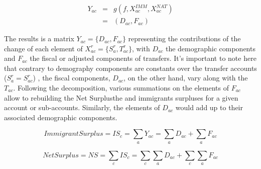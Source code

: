 \begin{eqnarray}
  Y_{ac}&=&g(f,X^{IMM}_{ac},X^{NAT}_{ac}) \nonumber \\
&=& (D_{ac}, F_{ac}) \label{eq:dc2}
\end{eqnarray}

The results is a matrix \( Y_{ac} = \{D_{ac}, F_{ac} \} \) representing the contributions of the change of each element of \( X^{r}_{ac} =  \{S^{r}_a, T^{r}_{ac} \}\), with \( D_{ac}\) the demographic components and \( F_{ac}\) the fiscal or adjusted components of transfers.
It's important to note here that contrary to demography components are constants over the transfer accounts (\( S^{r}_{a}=S^{r}_{ac} \)) , the fiscal components, \( D_{ac} \), on the other hand, vary along with the \(T_{ac}\).
Following the decomposition, various summations on the elements of \( F_{ac} \) allow to rebuilding the Net Surplusthe and immigrants surpluses for a given account or sub-accounts.
Similarly, the elements of \( D_{ac} \) would add up to their associated demographic components.

\begin{equation}\label{eq:dc3}
  Immigrant Surplus =IS_{c} = \displaystyle\sum_{a}Y_{ac} = \displaystyle\sum_{a}D_{ac} + \displaystyle\sum_{a}F_{ac}
\end{equation}

\begin{equation}\label{eq:dc4}
  Net Surplus = NS = \displaystyle\sum_{c}IS_{c} = \displaystyle\sum_{c}\displaystyle\sum_{a}D_{ac} + \displaystyle\sum_{c}\displaystyle\sum_{a}F_{ac}
\end{equation}

